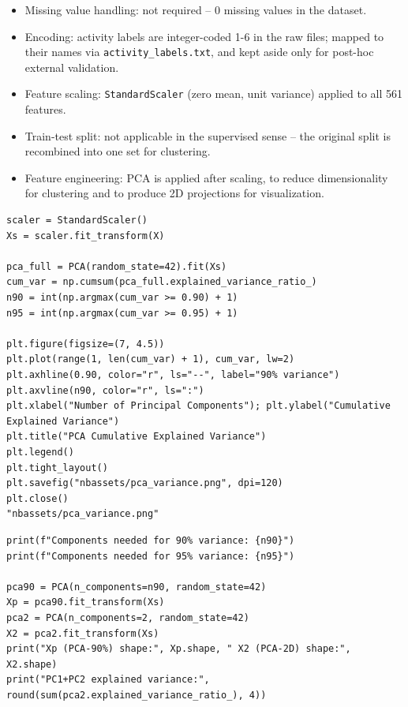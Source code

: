 \documentclass[12pt,a4paper]{article}
\begin{document}
\begin{itemize}
\item Missing value handling: not required -- 0 missing values in the dataset.
\item Encoding: activity labels are integer-coded 1-6 in the raw files; mapped
to their names via \texttt{activity\_labels.txt}, and kept aside only for
post-hoc external validation.
\item Feature scaling: \texttt{StandardScaler} (zero mean, unit variance) applied to
all 561 features.
\item Train-test split: not applicable in the supervised sense -- the original
split is recombined into one set for clustering.
\item Feature engineering: PCA is applied after scaling, to reduce
dimensionality for clustering and to produce 2D projections for
visualization.
\end{itemize}

\begin{verbatim}
scaler = StandardScaler()
Xs = scaler.fit_transform(X)

pca_full = PCA(random_state=42).fit(Xs)
cum_var = np.cumsum(pca_full.explained_variance_ratio_)
n90 = int(np.argmax(cum_var >= 0.90) + 1)
n95 = int(np.argmax(cum_var >= 0.95) + 1)

plt.figure(figsize=(7, 4.5))
plt.plot(range(1, len(cum_var) + 1), cum_var, lw=2)
plt.axhline(0.90, color="r", ls="--", label="90% variance")
plt.axvline(n90, color="r", ls=":")
plt.xlabel("Number of Principal Components"); plt.ylabel("Cumulative Explained Variance")
plt.title("PCA Cumulative Explained Variance")
plt.legend()
plt.tight_layout()
plt.savefig("nbassets/pca_variance.png", dpi=120)
plt.close()
"nbassets/pca_variance.png"
\end{verbatim}

\url{}

\begin{verbatim}
print(f"Components needed for 90% variance: {n90}")
print(f"Components needed for 95% variance: {n95}")

pca90 = PCA(n_components=n90, random_state=42)
Xp = pca90.fit_transform(Xs)
pca2 = PCA(n_components=2, random_state=42)
X2 = pca2.fit_transform(Xs)
print("Xp (PCA-90%) shape:", Xp.shape, " X2 (PCA-2D) shape:", X2.shape)
print("PC1+PC2 explained variance:", round(sum(pca2.explained_variance_ratio_), 4))
\end{verbatim}
\end{document}
